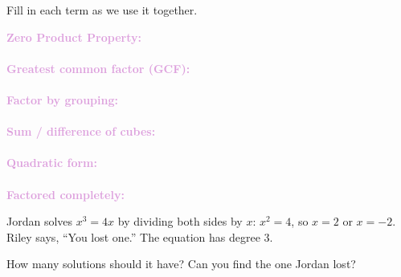 \documentclass[10pt]{article}
\begin{document}

\vspace{0.12in}

\boxguard
\begin{vocabbox}
Fill in each term as we use it together.
\par\vspace{2pt}
\noindent\textbf{\textcolor{plum}{Zero Product Property:}}\\[1pt]
\writeline\\[3pt]
\noindent\textbf{\textcolor{plum}{Greatest common factor (GCF):}}\\[1pt]
\writeline\\[3pt]
\noindent\textbf{\textcolor{plum}{Factor by grouping:}}\\[1pt]
\writeline\\[3pt]
\noindent\textbf{\textcolor{plum}{Sum / difference of cubes:}}\\[1pt]
\writeline\\[3pt]
\noindent\textbf{\textcolor{plum}{Quadratic form:}}\\[1pt]
\writeline\\[3pt]
\noindent\textbf{\textcolor{plum}{Factored completely:}}\\[1pt]
\writeline
\end{vocabbox}

\vspace{0.1in}

\boxguard
\begin{hookbox}
Jordan solves $x^3 = 4x$ by dividing both sides by $x$: $x^2 = 4$, so $x = 2$ or $x = -2$.
Riley says, ``You lost one.'' The equation has degree 3.

How many solutions should it have? Can you find the one Jordan lost?
\end{hookbox}
\end{document}
